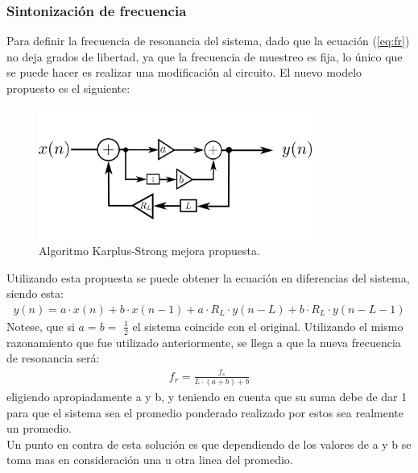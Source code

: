 \subsubsection{Sintonización de frecuencia}
Para definir la frecuencia  de resonancia del sistema, dado que la ecuación (\ref{eq:fr}) no deja grados de libertad, ya que la frecuencia de muestreo es fija, lo único que se puede hacer es realizar una modificación al circuito. El nuevo modelo propuesto es el siguiente:
\begin{figure}[H]
	\centering
	\includegraphics[width=0.8\textwidth]{ImagenesEjercicio4/mejoraks.PNG}
\caption{Algoritmo Karplus-Strong mejora propuesta.}
	\label{fig:ksmejora}
\end{figure}
Utilizando esta propuesta se puede obtener la ecuación en diferencias del sistema, siendo esta:
\begin{align}
y(n) = a\cdot x(n) +b\cdot x(n-1) + a\cdot R_L \cdot y(n-L)+b\cdot R_L \cdot y(n-L-1) 
\end{align}
Notese, que si $a=b=$ $\frac{1}{2}$ el sistema coincide con el original.
Utilizando el mismo razonamiento que fue utilizado anteriormente, se llega a que la nueva frecuencia de resonancia será:
\begin{align}
f_r=\frac{f_s}{L\cdot (a+b)+b}
\end{align}
eligiendo apropiadamente a y b, y teniendo en cuenta que su suma debe de dar 1 para que el sistema sea el promedio ponderado realizado por estos sea realmente un promedio.\\
Un punto en contra de esta solución es que dependiendo de los valores de a y b se toma mas en consideración una u otra linea del promedio.
